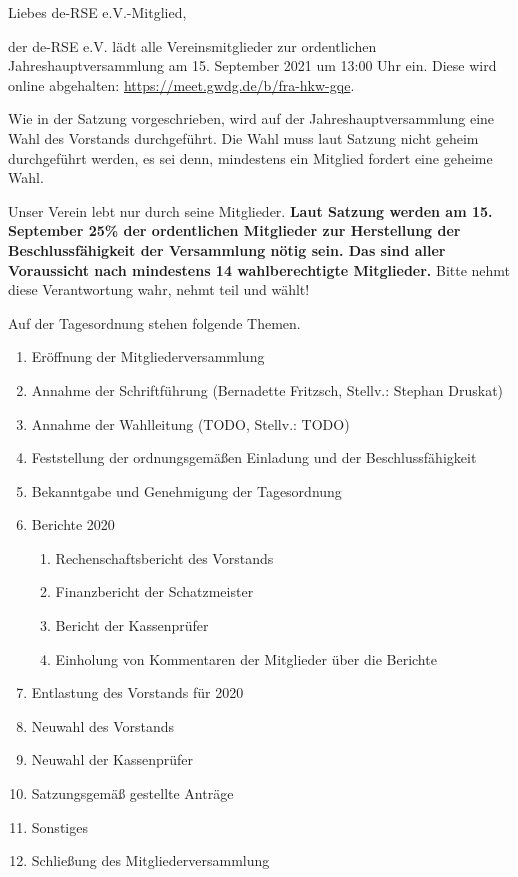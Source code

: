 \documentclass[../Vorlagen/de-RSE_Brief,a4paper]{scrlttr2}
\begin{document}

\begin{letter}{\mbox{}
}
\opening{Liebes de-RSE e.V.-Mitglied,}

der de-RSE e.V. lädt alle Vereinsmitglieder zur ordentlichen Jahreshauptversammlung am 15. September 2021 um 13:00 Uhr ein.
Diese wird online abgehalten: \href{https://meet.gwdg.de/b/fra-hkw-gqe}{https://meet.gwdg.de/b/fra-hkw-gqe}.

Wie in der Satzung vorgeschrieben, wird auf der Jahreshauptversammlung eine Wahl des Vorstands durchgeführt.
Die Wahl muss laut Satzung nicht geheim durchgeführt werden, es sei denn, mindestens ein Mitglied fordert eine geheime Wahl.

Unser Verein lebt nur durch seine Mitglieder.
\textbf{Laut Satzung werden am 15. September 25\% der ordentlichen Mitglieder zur Herstellung der Beschlussfähigkeit der Versammlung nötig sein. Das sind aller Voraussicht nach mindestens 14 wahlberechtigte Mitglieder.}
Bitte nehmt diese Verantwortung wahr, nehmt teil und wählt!

\clearpage
\vspace{2em}
Auf der Tagesordnung stehen folgende Themen.
\begin{enumerate}
\setlength\itemsep{0em}
\item Eröffnung der Mitgliederversammlung
\item Annahme der Schriftführung (Bernadette Fritzsch, Stellv.: Stephan Druskat)
\item Annahme der Wahlleitung (TODO, Stellv.: TODO)
\item Feststellung der ordnungsgemäßen Einladung und der Beschlussfähigkeit
\item Bekanntgabe und Genehmigung der Tagesordnung
\item Berichte 2020
\begin{enumerate}
 \item Rechenschaftsbericht des Vorstands
 \item Finanzbericht der Schatzmeister
 \item Bericht der Kassenprüfer
 \item Einholung von Kommentaren der Mitglieder über die Berichte
\end{enumerate}
\item Entlastung des Vorstands für 2020
\item Neuwahl des Vorstands
\item Neuwahl der Kassenprüfer
\item Satzungsgemäß gestellte Anträge
\item Sonstiges
\item Schließung des Mitgliederversammlung
\end{enumerate}


\end{letter}
\end{document}
